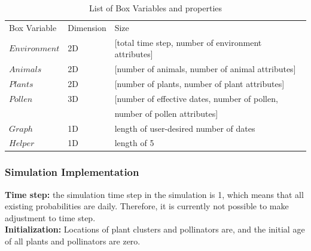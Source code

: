 \documentclass[3p,,preprint,12pt]{elsarticle}
\begin{document}
    \begin{table}[!htb]
    \begin{center}
    \begin{tabular}{ l l l}
    Box Variable & Dimension & Size \\
    $Environment$ & 2D & [total time step, number of environment attributes] \\
    $Animals$ & 2D & [number of animals, number of animal attributes] \\
    $Plants$ & 2D & [number of plants, number of plant attributes] \\ 
    $Pollen$ & 3D & [number of effective dates, number of pollen, \\
    && number of pollen attributes]\\
    $Graph$ & 1D & length of user-desired number of dates \\
    $Helper$ & 1D & length of 5 \\
    \end{tabular}
    \caption{\label{tab:table-name}List of Box Variables and properties}
    \end{center}
    \end{table}
\pagebreak

\subsubsection{Simulation Implementation} 

\noindent \textbf{Time step:} the simulation time step in the simulation is 1, which means that all existing probabilities are daily. Therefore, it is currently not possible to make adjustment to time step. \\

\noindent \textbf{Initialization:} Locations of plant clusters and pollinators are, and the initial age of all plants and pollinators are zero. \\
\end{document}
